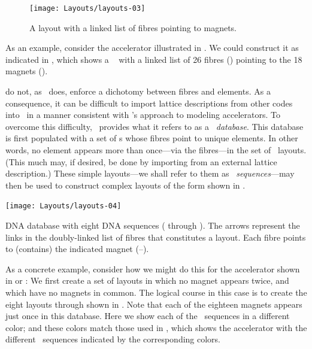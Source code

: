 \begin{figure}[ht]%
  \centering
  \texttt{[image: Layouts/layouts-03]}
  \caption{A layout with a linked list of fibres pointing to magnets.}
  \label{fig:CEBAF.layout.fibres}
\end{figure}

As an example,%
consider the accelerator illustrated in
. We could construct it as indicated in
, which shows a \PTC\ 
with a linked list of 26 fibres () pointing to the
18 magnets ().

%
 do not, as \PTC\ does,
enforce a dichotomy between fibres and elements. As a consequence,
it can be difficult to import lattice descriptions from other codes
into \PTC\ in a manner consistent with \PTC's approach to modeling
accelerators. To overcome this difficulty, \PTC\ provides what it
refers to as a \emph{\DNA\ database}. This database is first
populated with a set of s whose fibres point to
unique elements.  In other words, no element appears more than
once---via the fibres---in the set of \DNA\ layouts. (This much may,
if desired, be done by importing from an external lattice description.)
These simple layouts---we shall refer to them as
\emph{\DNA\ sequences}---may then be used to construct complex layouts
of the form shown in .

\begin{marginfigure}[-2\baselineskip]
  \texttt{[image: Layouts/layouts-04]}\vspace{5pt}
  \caption{DNA database with eight DNA sequences (
           through ). The arrows represent the links in
           the doubly-linked list of fibres that constitutes a layout.
           Each fibre points to (contains) the indicated magnet
           (--).}
  \label{fig:DNA.database}
\end{marginfigure}
%
%
As a concrete example, consider how we might do this for the
accelerator shown in  or :
We first create a set of layouts in which no magnet appears
twice, and which have no magnets in common. The logical course
in this case is to create the eight layouts  through
 shown in . Note that each of the
eighteen magnets appears just once in this database. Here we show
each of the \DNA\ sequences in a different color; and these colors
match those used in , which shows the accelerator
with the different \DNA\ sequences indicated by the corresponding
colors.

